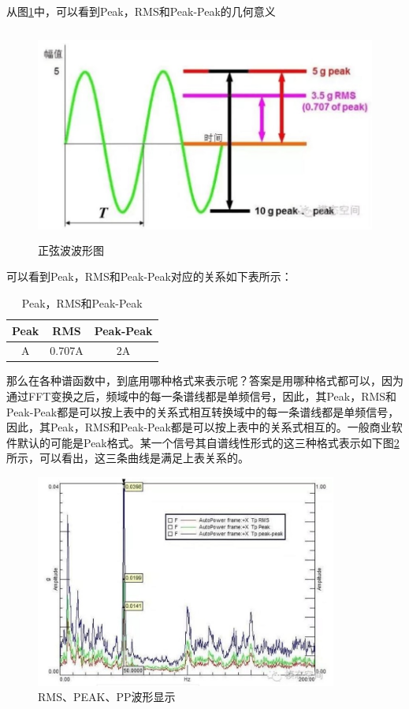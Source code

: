 \documentclass{article}
\begin{document}
	从图\ref{正弦波波形图}中，可以看到Peak，RMS和Peak-Peak的几何意义
	\begin{figure}[htbp]
		\centering
		\includegraphics[height=7cm]{sin_wave.jpg}
		\caption{正弦波波形图}\label{正弦波波形图}
	\end{figure}
	可以看到Peak，RMS和Peak-Peak对应的关系如下表所示：
	\begin{table}[htbp] %
		\centering
		\caption{Peak，RMS和Peak-Peak}
		\begin{tabular}{ccc} %
			\hline  %
			Peak & RMS &Peak-Peak\\ %
			\hline
			A &0.707A &2A\\
			\hline
		\end{tabular}
	\end{table}
	\par 那么在各种谱函数中，到底用哪种格式来表示呢？答案是用哪种格式都可以，因为通过FFT变换之后，频域中的每一条谱线都是单频信号，因此，其Peak，RMS和Peak-Peak都是可以按上表中的关系式相互转换域中的每一条谱线都是单频信号，因此，其Peak，RMS和Peak-Peak都是可以按上表中的关系式相互的。一般商业软件默认的可能是Peak格式。某一个信号其自谱线性形式的这三种格式表示如下图\ref{RMS_PEAK_PP}所示，可以看出，这三条曲线是满足上表关系的。
	\begin{figure}[htbp]
		\centering
		\includegraphics[height=7cm]{rms_peak_PP.jpg}
		\caption{RMS、PEAK、PP波形显示}\label{RMS_PEAK_PP}
    \end{figure}
\end{document}
